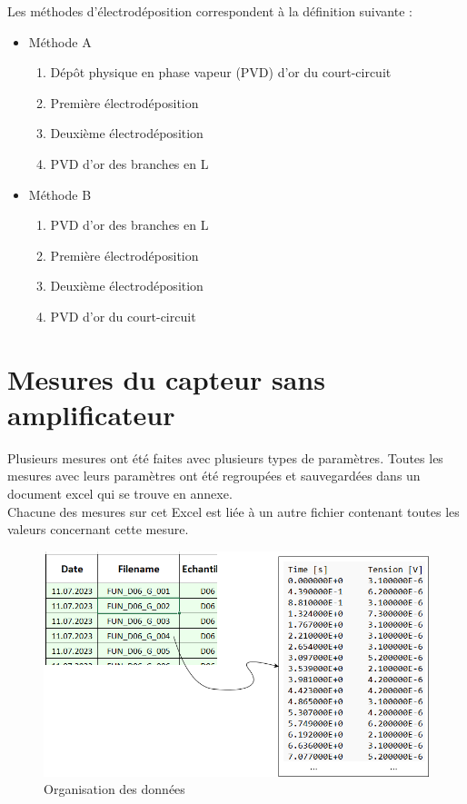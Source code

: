 Les méthodes d'électrodéposition correspondent à la définition suivante :
\begin{itemize}
    \item Méthode A
          \begin{enumerate}
              \item Dépôt physique en phase vapeur (PVD) d'or du court-circuit
              \item Première électrodéposition
              \item Deuxième électrodéposition
              \item PVD d'or des branches en L
          \end{enumerate}
    \item Méthode B
          \begin{enumerate}
              \item PVD d'or des branches en L
              \item Première électrodéposition
              \item Deuxième électrodéposition
              \item PVD d'or du court-circuit
          \end{enumerate}
\end{itemize}

\section{Mesures du capteur sans amplificateur}
Plusieurs mesures ont été faites avec plusieurs types de paramètres. Toutes les mesures avec leurs paramètres ont été regroupées et sauvegardées
dans un document excel qui se trouve en annexe.\\
Chacune des mesures sur cet Excel est liée à un autre fichier contenant toutes les valeurs concernant cette mesure.
\begin{figure}[H]
    \centering
    \includegraphics[scale = 0.4]{assets/figures/Data.png}
    \caption{Organisation des données}
    \label{fig:data_orga}
\end{figure}

